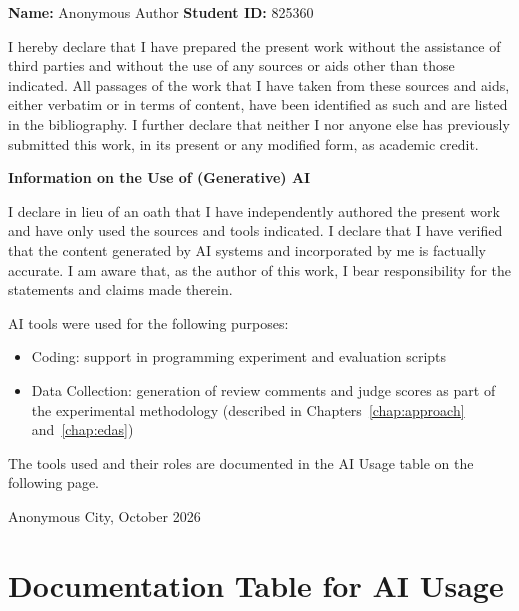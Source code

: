 \noindent
\textbf{Name:} Anonymous Author \hfill \textbf{Student ID:} 825360

\bigskip
\noindent
I hereby declare that I have prepared the present work without the assistance
of third parties and without the use of any sources or aids other than those
indicated. All passages of the work that I have taken from these sources and
aids, either verbatim or in terms of content, have been identified as such and
are listed in the bibliography. I further declare that neither I nor anyone
else has previously submitted this work, in its present or any modified form,
as academic credit.

\bigskip
\textbf{Information on the Use of (Generative) AI}

\medskip
\noindent
I declare in lieu of an oath that I have independently authored the present
work and have only used the sources and tools indicated. I declare that I have
verified that the content generated by AI systems and incorporated by me is
factually accurate. I am aware that, as the author of this work, I bear
responsibility for the statements and claims made therein.

\medskip
\noindent
AI tools were used for the following purposes:
\begin{itemize}[nosep]
    \item[\checkmark] Coding: support in programming experiment and evaluation scripts
    \item[\checkmark] Data Collection: generation of review comments and judge
          scores as part of the experimental methodology
          (described in Chapters~\ref{chap:approach} and~\ref{chap:edas})
\end{itemize}

\noindent
The tools used and their roles are documented in the AI Usage table on the
following page.

\vspace{6ex}
\begin{flushleft}
    Anonymous City, October 2026
    \hspace*{2em}
\end{flushleft}

\clearpage

\section*{Documentation Table for AI Usage}

